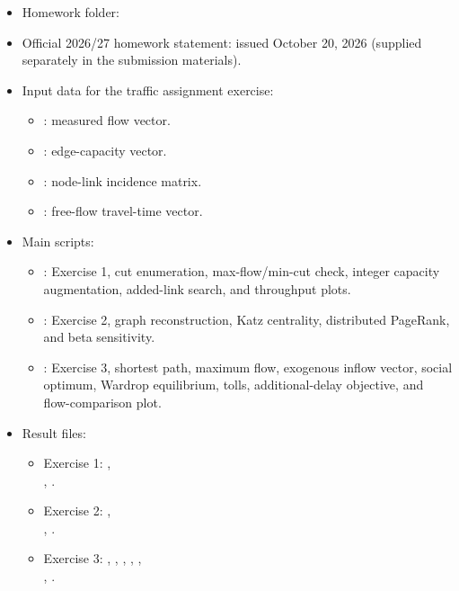 \documentclass[11pt,a4paper]{article}
\begin{document}
\begin{itemize}
    \item Homework folder: 
    \item Official 2026/27 homework statement: issued October 20, 2026 (supplied separately in the submission materials).
    \item Input data for the traffic assignment exercise:
    \begin{itemize}
        \item {}: measured flow vector.
        \item {}: edge-capacity vector.
        \item {}: node-link incidence matrix.
        \item {}: free-flow travel-time vector.
    \end{itemize}
    \item Main scripts:
    \begin{itemize}
        \item {}: Exercise 1, cut enumeration, max-flow/min-cut check, integer capacity augmentation, added-link search, and throughput plots.
        \item {}: Exercise 2, graph reconstruction, Katz centrality, distributed PageRank, and beta sensitivity.
        \item {}: Exercise 3, shortest path, maximum flow, exogenous inflow vector, social optimum, Wardrop equilibrium, tolls, additional-delay objective, and flow-comparison plot.
    \end{itemize}
    \item Result files:
    \begin{itemize}
        \item Exercise 1: , \\ , .
        \item Exercise 2: , \\ , .
        \item Exercise 3: , , , , , \\ , .

\end{itemize}
\end{itemize}
\end{document}
